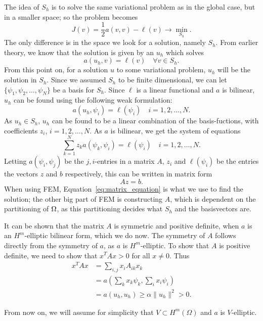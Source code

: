 The idea of $S_h$ is to solve the same variational problem as in the global case, 
but in a smaller space; so the problem becomes
\begin{equation*}
    J(v) = \frac{1}{2}a(v,v) - \ell(v) \to \underset{S_h}{\min}.
\end{equation*}
The only difference is in the space we look for a solution, namely $S_h$. From 
earlier theory, we know that the solution is given by an $u_h$ which solves
\begin{equation*}
    a(u_h,v) = \ell(v) \quad \forall v \in S_h.
\end{equation*}
From this point on, for a solution $u$ to some variational problem, $u_h$ will be the solution in $S_h$.
Since we assumed $S_h$ to be finite dimensional, we can let $ \{ \psi_1, \psi_2, \ldots, \psi_N \}$ 
be a basis for $S_h$. Since $\ell$ is a linear functional and $a$ is bilinear, 
$u_h$ can be found using the following weak formulation:
\begin{equation*}
    a(u_h, \psi_i) = \ell(\psi_i) \quad i = 1, 2, \ldots, N.
\end{equation*}
As $u_h \in S_h$, $u_h$ can be found to be a linear combination of the basis-fuctions, with 
coefficients $z_i$, $i=1, 2, \ldots, N$. As $a$ is bilinear, we get the system of 
equations
\begin{equation*}
    \sum_{k=1}^N z_k a(\psi_k,\psi_i) = \ell(\psi_i) \quad i = 1,2,\ldots,N.
\end{equation*}
Letting $a(\psi_i,\psi_j)$ be the $j,i$-entries in a matrix $A$, $z_i$ and $\ell(\psi_i)$ 
be the entries the vectors $z$ and $b$ respectively, this can be written in matrix form 
\begin{equation}
    Az = b. \label{eq:matrix_equation}
\end{equation}
When using FEM, Equation~\eqref{eq:matrix_equation} is what we use to find the solution; 
the other big part of FEM is constructing $A$, which is dependent on the partitioning of $\Omega$, 
as this partitioning decides what $S_h$ and the basisvectors are.

It can be shown that the matrix $A$ is symmetric and positive definite, when $a$ is an $H^m$-elliptic bilinear form, which we do now. 
The symmetry of $A$ follows directly from the symmetry of $a$, as $a$ is $H^m$-elliptic.
To show that $A$ is positive definite, we need to show that $x^T Ax > 0$ for all $x \neq 0$. Thus
\begin{align*}
    x^T Ax &= \sum_{i,j} x_i A_{ik}x_k \\
    &= a\left(\sum_{k} x_k\psi_k,\sum_{i} x_i\psi_i\right) \\
    &= a(u_h,u_h) \geq \alpha \|u_h\|^2 > 0.
\end{align*}

From now on, we will assume for simplicity that $V\subset H^m(\Omega)$ and $a$ is $V$-elliptic.

